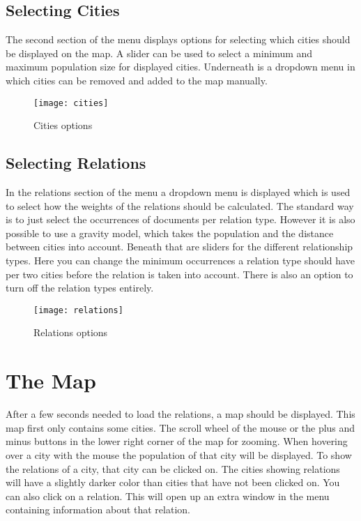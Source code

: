 \subsection{Selecting Cities}
The second section of the menu displays options for selecting which cities should be displayed on the map. A slider can be used to select a minimum and maximum population size for displayed cities. Underneath is a dropdown menu in which cities can be removed and added to the map manually. 

\begin{figure}[H]
    \centering
    \texttt{[image: cities]}
    \caption{Cities options}
    \label{fig:infoflow}
\end{figure}


\subsection{Selecting Relations}
In the relations section of the menu a dropdown menu is displayed which is used to select how the weights of the relations should be calculated. The standard way is to just select the occurrences of documents per relation type. However it is also possible to use a gravity model, which takes the population and the distance between cities into account.  Beneath that are sliders for the different relationship types. Here you can change the minimum occurrences a relation type should have per two cities before the relation is taken into account. There is also an option to turn off the relation types entirely.

\begin{figure}[H]
    \centering
    \texttt{[image: relations]}
    \caption{Relations options}
    \label{fig:infoflow}
\end{figure}


\section{The Map}
After a few seconds needed to load the relations, a map should be displayed. This map first only contains some cities. The scroll wheel of the mouse or the plus and minus buttons in the lower right corner of the map for zooming. When hovering over a city with the mouse the population of that city will be displayed. To show the relations of a city, that city can be clicked on. The cities showing relations will have a slightly darker color than cities that have not been clicked on. You can also click on a relation. This will open up an extra window in the menu containing information about that relation.


